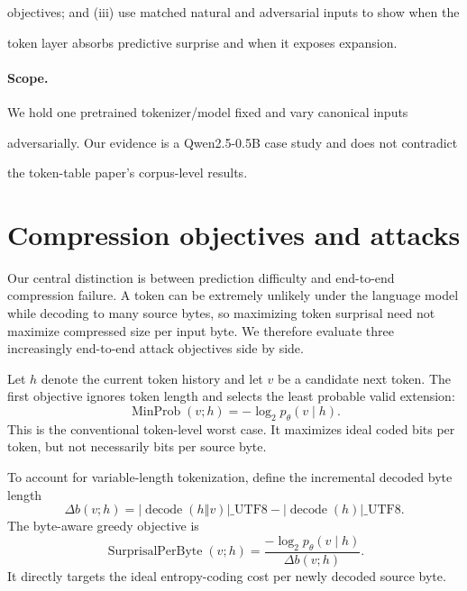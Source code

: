 \documentclass{article}
\newcommand{\bytes}[1]{\lvert #1\rvert\_{\mathrm{UTF8}}}
\begin{document}
objectives; and (iii) use matched natural and adversarial inputs to show when the

token layer absorbs predictive surprise and when it exposes expansion.

\paragraph{Scope.}

We hold one pretrained tokenizer/model fixed and vary canonical inputs

adversarially. Our evidence is a Qwen2.5-0.5B case study and does not contradict

the token-table paper's corpus-level results.

\section{Compression objectives and attacks}
\label{sec:attacks}

Our central distinction is between prediction difficulty and end-to-end compression
failure. A token can be extremely unlikely under the language model while decoding
to many source bytes, so maximizing token surprisal need not maximize compressed
size per input byte. We therefore evaluate three increasingly end-to-end attack
objectives side by side.

Let $h$ denote the current token history and let $v$ be a candidate next token. The
first objective ignores token length and selects the least probable valid extension:
\begin{equation}
  \operatorname{MinProb}(v;h)=-\log_2 p_\theta(v\mid h).
  \label{eq:minprob}
\end{equation}
This is the conventional token-level worst case. It maximizes ideal coded bits per
token, but not necessarily bits per source byte.

To account for variable-length tokenization, define the incremental decoded byte
length
\begin{equation}
  \Delta b(v;h)=
  \bytes{\operatorname{decode}(h\mathbin\Vert v)}-
  \bytes{\operatorname{decode}(h)}.
\end{equation}
The byte-aware greedy objective is
\begin{equation}
  \operatorname{SurprisalPerByte}(v;h)=
  \frac{-\log_2 p_\theta(v\mid h)}{\Delta b(v;h)}.
  \label{eq:spb}
\end{equation}
It directly targets the ideal entropy-coding cost per newly decoded source byte.
\end{document}
